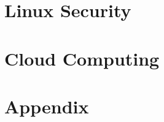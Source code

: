 










\part{Linux Security}








\part{Cloud Computing}







\part{Appendix}






\printindex


